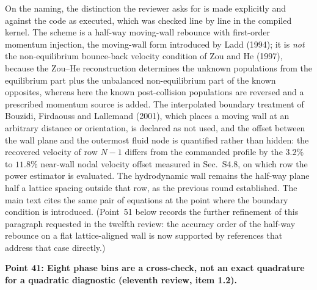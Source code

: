 \documentclass[11pt,a4paper]{article}
\begin{document}
On the naming, the distinction the reviewer asks for is made explicitly and against the
code as executed, which was checked line by line in the compiled kernel. The scheme is a
half-way moving-wall rebounce with first-order momentum injection, the moving-wall form
introduced by Ladd (1994); it is \emph{not} the non-equilibrium bounce-back velocity
condition of Zou and He (1997), because the Zou--He reconstruction determines the unknown
populations from the equilibrium part plus the unbalanced non-equilibrium part of the
known opposites, whereas here the known post-collision populations are reversed and a
prescribed momentum source is added. The interpolated boundary treatment of Bouzidi,
Firdaouss and Lallemand (2001), which places a moving wall at an arbitrary distance or
orientation, is declared as not used, and the offset between the wall plane and the
outermost fluid node is quantified
rather than hidden: the recovered velocity of row \(N-1\) differs from the commanded
profile by the \(3.2\%\) to \(11.8\%\) near-wall nodal velocity offset measured in
Sec.~S4.8, on which row the power
estimator is evaluated. The hydrodynamic wall remains the half-way plane half a lattice
spacing outside that row, as the previous round established. The main text cites the same
pair of equations at the point where the boundary condition is introduced.
(Point~51 below records the further refinement of this paragraph requested in the
twelfth review: the accuracy order of the half-way rebounce on a flat lattice-aligned
wall is now supported by references that address that case directly.)

\vspace{1em}

\noindent\textbf{Point 41: Eight phase bins are a cross-check, not an exact quadrature for
a quadratic diagnostic (eleventh review, item 1.2).}
\end{document}
